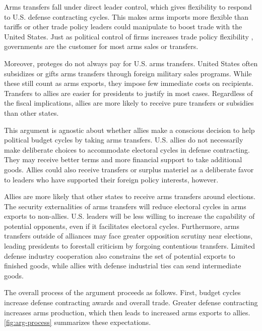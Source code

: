 \documentclass[12pt]{article}
\begin{document}
Arms transfers fall under direct leader control, which gives flexibility to respond to U.S. defense contracting cycles.
This makes arms imports more flexible than tariffs or other trade policy leaders could manipulate to boost trade with the United States.
Just as political control of firms increases trade policy flexibility \citep{Davisetal2019}, governments are the customer for most arms sales or transfers. 


Moreover, proteges do not always pay for U.S. arms transfers.
United States often subsidizes or gifts arms transfers through foreign military sales programs. 
While these still count as arms exports, they impose few immediate costs on recipients.
Transfers to allies are easier for presidents to justify in most cases.
Regardless of the fiscal implications, allies are more likely to receive pure transfers or subsidies than other states.


This argument is agnostic about whether allies make a conscious decision to help political budget cycles by taking arms transfers.
U.S. allies do not necessarily make deliberate choices to accommodate electoral cycles in defense contracting. 
They may receive better terms and more financial support to take additional goods. 
Allies could also receive transfers or surplus materiel as a deliberate favor to leaders who have supported their foreign policy interests, however. 


Allies are more likely that other states to receive arms transfers around elections.
The security externalities of arms transfers will reduce electoral cycles in arms exports to non-allies. 
U.S. leaders will be less willing to increase the capability of potential opponents, even if it facilitates electoral cycles.
Furthermore, arms transfers outside of alliances may face greater opposition scrutiny near elections, leading presidents to forestall criticism by forgoing contentious transfers.
Limited defense industry cooperation also constrains the set of potential exports to finished goods, while allies with defense industrial ties can send intermediate goods.


The overall process of the argument proceeds as follows.
First, budget cycles increase defense contracting awards and overall trade. 
Greater defense contracting increases arms production, which then leads to increased arms exports to allies.
\autoref{fig:arg-process} summarizes these expectations.
\end{document}
